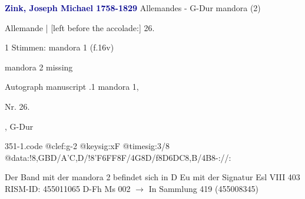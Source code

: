 \documentclass[twocolumn]{book}
\begin{document}
\newline \par \vspace{7pt} \textcolor{darkblue}{\textbf{Zink, Joseph Michael  1758-1829}}
\newline Allemandes - G-Dur
\newline mandora (2)
\newline \begin{itshape}[f.16v, at left:] Allemande | [left before the accolade:] 26.\end{itshape} 
\newline \textcolor{darkblue}{}  1 Stimmen: mandora 1  (f.16v)
\newline \begin{small} mandora 2 missing\end{small} 
\newline Autograph manuscript
.1  mandora 1, \begin{itshape}Nr. 26.\end{itshape}, G-Dur  
\begin{filecontents*}{351-1.code}
@clef:g-2
@keysig:xF
@timesig:3/8
@data:!8,GBD/A'C,D/!{8'F6FF8F}/4G8D/f{8D6DC8,B}/4B8-://:
\end{filecontents*}
\newline
%
\newline Der Band mit der mandora 2 befindet sich in D Eu mit der Signatur Esl VIII 403
\newline RISM-ID: 455011065
\newline D-Fh  Ms 002
\newline $\rightarrow$ In Sammlung 419 (455008345)
      
\end{document}
